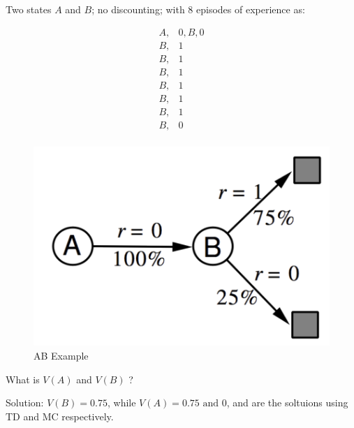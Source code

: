 \begin{example}[AB Example]
    Two states \(A\) and \(B\); no discounting; with 8 episodes of experience as:
    \begin{figure}[H]
        \begin{minipage}{0.5\textwidth}
          \[
            \begin{aligned}
                A, & 0, B, 0 \\
                B, & 1\\ 
                B, & 1\\        
                B, & 1\\        
                B, & 1\\        
                B, & 1\\        
                B, & 1\\        
                B, & 0\\        
            \end{aligned}
          \]
        \end{minipage}%
        \begin{minipage}{0.5\textwidth}
          \includegraphics[width=\textwidth]{figures/ab-ex.png}
          \caption{AB Example}
            \label{fig:ab_ex}
        \end{minipage}
      \end{figure}
      What is \(V(A)\) and \(V(B)\) ?

      Solution: \(V(B) = 0.75\), while \(V(A) = 0.75 \text{ and } 0\), and are the soltuions
      using TD and MC respectively.
\end{example}

